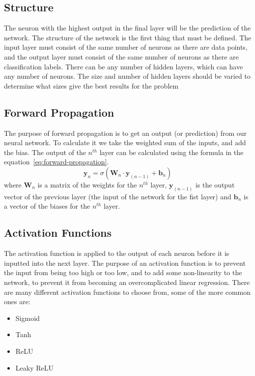 \documentclass[titlepage]{article}
\begin{document}
\subsection{Structure}
The neuron with the highest output in the final layer will be the prediction of the network. The structure of the network is the first thing that must be defined. The
input layer must consist of the same number of neurons as there are data points, and the output layer must consist of the same number of neurons as there are classification labels. There can be any number of hidden layers, which can have any number of neurons. The size and number of hidden layers should be varied to determine what sizes give the best results for the problem

\subsection{Forward Propagation}
The purpose of forward propagation is to get an output (or prediction) from our neural network. To calculate it we take the weighted sum of the inputs, and add the bias. The output of the $n^{th}$ layer can be calculated using the formula in the equation~\ref{eq:forward-propagation}.
\begin{equation}
    \textbf{y}_n = \sigma{(\textbf{W}_n\cdot\textbf{y}_{(n-1)} + \textbf{b}_n)}
    \label{eq:forward-propagation}
\end{equation}
where $\textbf{W}_n$ is a matrix of the weights for the $n^{th}$ layer, $\textbf{y}_{(n-1)}$ is the output vector of the previous layer (the input of the network for the fist layer) and $\textbf{b}_n$ is a vector of the biases for the $n^{th}$ layer.


\subsection{Activation Functions}
The activation function is applied to the output of each neuron before it is inputted into the next layer. The purpose of an activation function is to prevent the input from being too high or too low, and to add some non-linearity to the network, to prevent it from becoming an overcomplicated linear regression. There are many different activation functions to choose from, some of the more common ones are:
\begin{itemize}
    \item Sigmoid
    \item Tanh
    \item ReLU
    \item Leaky ReLU
\end{itemize}
\end{document}
